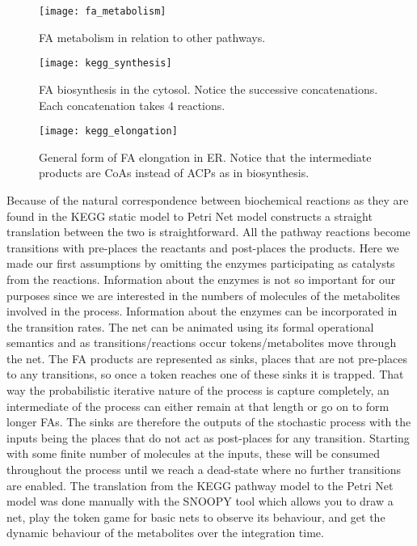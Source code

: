 \begin{figure}[htbp!]
\centering
\texttt{[image: fa\_metabolism]}
\caption[FA metabolism]{FA metabolism in relation to other pathways.}
\label{fig:fa_synthesis}
\end{figure}

\begin{figure}[htbp!]
\centering
\texttt{[image: kegg\_synthesis]}
\caption[Fatty Acid biosynthsis in cytosol]{FA biosynthesis in the
  cytosol. Notice the successive concatenations. Each concatenation
  takes 4 reactions.}
\label{fig:kegg_synthesis}
\end{figure}

\begin{figure}[htbp!]
\centering
\texttt{[image: kegg\_elongation]}
\caption[Fatty Acid elongation in ER]{General form of FA elongation in
ER. Notice that the intermediate products are CoAs instead of ACPs as
in biosynthesis.}
\label{fig:kegg_elongation}
\end{figure}

Because of the natural correspondence between biochemical reactions as
they are found in the KEGG static model to Petri Net model constructs
a straight translation between the two is straightforward. All the
pathway reactions become transitions with pre-places the reactants and
post-places the products. Here we made our first assumptions by
omitting the enzymes participating as catalysts from the reactions. Information about the enzymes
is not so important for our purposes since we are interested in the
numbers of molecules of the metabolites involved in the process. Information
about the enzymes can be incorporated in the transition rates.
The net can be animated using its formal
operational semantics and as transitions/reactions occur
tokens/metabolites move through the net. The FA products are
represented as sinks, places that are not pre-places to any
transitions, so once a token reaches one of these sinks it is
trapped. That way the probabilistic iterative nature of the process is
capture completely, an intermediate of the process can either remain
at that length or go on to form longer FAs. The sinks are therefore
the outputs of the stochastic process with the inputs being the places
that do not act as post-places for any transition. Starting with some
finite number of molecules at the inputs, these will be consumed
throughout the process until we reach a dead-state where no further
transitions are enabled. The translation from the KEGG pathway model
to the Petri Net model was done manually with the SNOOPY \cite []
{heiner2012snoopy}tool which
allows you to draw a net, play the token game for basic nets to
observe its behaviour, and get the dynamic behaviour of the
metabolites over the integration time.

